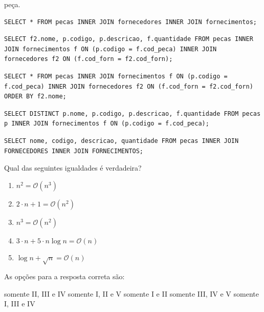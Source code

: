 \documentclass[12pt, addpoints]{exam}
\begin{document}
\begin{questions}
peça.
\begin{choices}
\choice \begin{verbatim}SELECT * FROM pecas INNER JOIN fornecedores INNER JOIN fornecimentos;\end{verbatim} 
\choice \begin{verbatim}SELECT f2.nome, p.codigo, p.descricao, f.quantidade FROM pecas INNER JOIN fornecimentos f ON (p.codigo = f.cod_peca) INNER JOIN fornecedores f2 ON (f.cod_forn = f2.cod_forn);\end{verbatim} 
\choice \begin{verbatim}SELECT * FROM pecas INNER JOIN fornecimentos f ON (p.codigo = f.cod_peca) INNER JOIN fornecedores f2 ON (f.cod_forn = f2.cod_forn) ORDER BY f2.nome;\end{verbatim} 
\choice \begin{verbatim}SELECT DISTINCT p.nome, p.codigo, p.descricao, f.quantidade FROM pecas p INNER JOIN fornecimentos f ON (p.codigo = f.cod_peca);\end{verbatim} 
\choice \begin{verbatim}SELECT nome, codigo, descricao, quantidade FROM pecas INNER JOIN FORNECEDORES INNER JOIN FORNECIMENTOS;\end{verbatim} 
\end{choices}

\question

Qual das seguintes igualdades é verdadeira?



\begin{enumerate}

    \item[(I)] \( n^2 = \mathcal{O}(n^3) \)

    \item[(II)] \( 2 \cdot n + 1 = \mathcal{O}(n^2) \)

    \item[(III)] \( n^3 = \mathcal{O}(n^2) \)

    \item[(IV)] \( 3 \cdot n + 5 \cdot n \log n = \mathcal{O}(n) \)

    \item[(V)] \( \log n + \sqrt{n} = \mathcal{O}(n) \)

\end{enumerate}



As opções para a resposta correta são:
\begin{choices}
\choice somente II, III e IV
\choice somente I, II e V
\choice somente I e II
\choice somente III, IV e V
\choice somente I, III e IV
\end{choices}


\end{questions}
\end{document}
